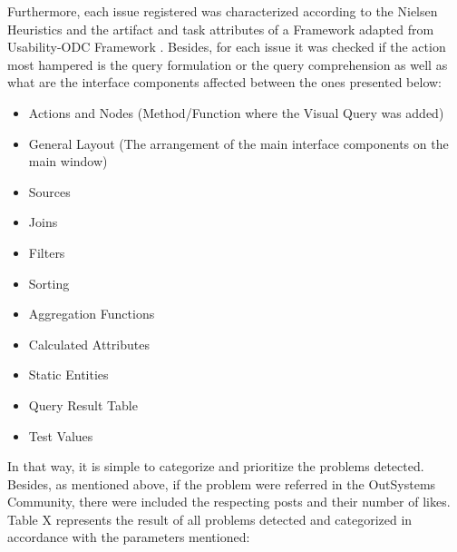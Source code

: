 Furthermore, each issue registered was characterized according to the Nielsen Heuristics \cite{nielsen_heuristics} and the artifact and task attributes of a Framework adapted from Usability-ODC Framework \cite{in_process_usability_problem_classification_analysis_improvement}. Besides, for each issue it was checked if the action most hampered is the query formulation or the query comprehension as well as what are the interface components affected between the ones presented below:

\begin{itemize}
    \item Actions and Nodes (Method/Function where the Visual Query was added)
    \item General Layout (The arrangement of the main interface components on the main window)
    \item Sources
    \item Joins
    \item Filters
    \item Sorting
    \item Aggregation Functions
    \item Calculated Attributes
    \item Static Entities
    \item Query Result Table
    \item Test Values
\end{itemize}

In that way, it is simple to categorize and prioritize the problems detected. Besides, as mentioned above, if the problem were referred in the OutSystems Community, there were included the respecting posts and their number of likes. Table X represents the result of all problems detected and categorized in accordance with the parameters mentioned:


